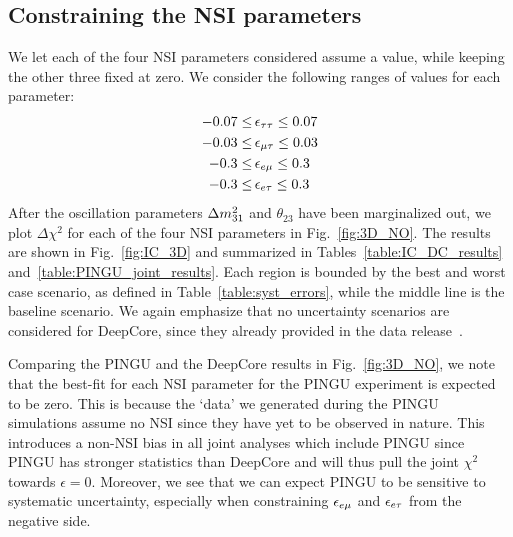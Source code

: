 {\subsection{Constraining the NSI parameters}\label{sec:constraining_NSI}
We let each of the four NSI parameters considered assume a value, while keeping the other three fixed at zero. We consider the following ranges of values for each parameter:
\begin{align}
   -0.07 \le &\, \epsilon_{\tau\tau} \le 0.07 \nonumber \\
   -0.03 \le &\, \epsilon_{\mu\tau} \le 0.03 \nonumber \\
   -0.3 \le &\, \epsilon_{e\mu} \le 0.3 \nonumber \\
   -0.3 \le &\, \epsilon_{e\tau} \le 0.3 \nonumber \\
\end{align}
After the oscillation parameters $\dm[31]$ and $\theta_{23}$ have been marginalized out, we plot $\Delta \chi^2$ for each of the four NSI parameters in Fig.~\ref{fig:3D_NO}. 
The results are shown in Fig.~\ref{fig:IC_3D} and summarized in Tables~\ref{table:IC_DC_results} and~\ref{table:PINGU_joint_results}. Each region is bounded
by the best and worst case scenario, as defined in Table~\ref{table:syst_errors}, while the middle line is the baseline scenario. We again emphasize that 
no uncertainty scenarios are considered for DeepCore, since they already provided in the data release~\cite{DC2019data}.

Comparing the PINGU and the DeepCore results in Fig.~\ref{fig:3D_NO}, we note that the best-fit for each NSI parameter for the PINGU experiment is expected to be zero. This is because the `data' we generated during 
the PINGU simulations assume no NSI since they have yet to be observed in nature. This introduces a non-NSI bias in all joint analyses which include PINGU
since PINGU has stronger statistics than DeepCore and will thus pull the joint $\chi^2$ towards $\epsilon =0$.
Moreover, we see that we can expect PINGU to be sensitive to systematic uncertainty, especially when constraining $\epsilon_{e\mu}$ and $\epsilon_{e\tau}$ from the negative side.

}
